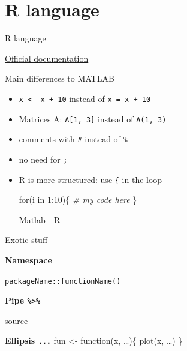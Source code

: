 \documentclass[8pt,ignorenonframetext,]{beamer}
\newenvironment{Shaded}{\begin{snugshade}}{\end{snugshade}}
\newcommand{\KeywordTok}[1]{\textcolor[rgb]{0.13,0.29,0.53}{\textbf{{#1}}}}
\newcommand{\DecValTok}[1]{\textcolor[rgb]{0.00,0.00,0.81}{{#1}}}
\newcommand{\StringTok}[1]{\textcolor[rgb]{0.31,0.60,0.02}{{#1}}}
\newcommand{\CommentTok}[1]{\textcolor[rgb]{0.56,0.35,0.01}{\textit{{#1}}}}
\newcommand{\NormalTok}[1]{{#1}}
\begin{document}
\section{R language}\label{r-language}

\begin{frame}[fragile]{R language}

\href{https://cran.r-project.org/doc/manuals/r-devel/R-lang.html}{Official
documentation}

\begin{block}{Main differences to MATLAB}

\begin{itemize}
\item
  \texttt{x\ \textless{}-\ x\ +\ 10} instead of \texttt{x\ =\ x\ +\ 10}
\item
  Matrices A: \texttt{A{[}1,\ 3{]}} instead of \texttt{A(1,\ 3)}
\item
  comments with \texttt{\#} instead of \texttt{\%}
\item
  no need for \texttt{;}
\item
  R is more structured: use \texttt{\{} in the loop

\begin{Shaded}
\begin{Highlighting}[]
\NormalTok{for(i in }\DecValTok{1}\NormalTok{:}\DecValTok{10}\NormalTok{)\{}
  \CommentTok{# my code here}
\NormalTok{\}}
\end{Highlighting}
\end{Shaded}

  \href{https://cran-r.c3sl.ufpr.br/doc/contrib/Hiebeler-matlabR.pdf}{Matlab
  - R}
\end{itemize}

\end{block}

\begin{block}{Exotic stuff}

\textbf{Namespace}

\texttt{packageName::functionName()}

\textbf{Pipe \texttt{\%\textgreater{}\%}}

\begin{Shaded}
\end{Shaded}

\href{https://bookdown.org/rdpeng/exdata/managing-data-frames-with-the-dplyr-package.html\#section}{source}

\textbf{Ellipsis \texttt{...}} fun \textless{}- function(x, \ldots{})\{
plot(x, \ldots{}) \}

\end{block}

\end{frame}
\end{document}
